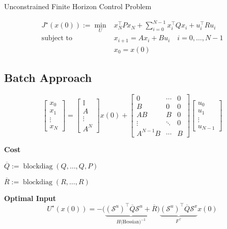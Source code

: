Unconstrained Finite Horizon Control Problem

$$\begin{aligned}
		J^\star(x(0)) :=
		\min_U & x_N^\top P x_N +
		\textstyle\sum_{i=0}^{N-1}
		x_i^\top Q x_i + u_i^\top R u_i
		\\
		\text{subject to  }
		       & x_{i+1}                = Ax_i+Bu_i
		\quad i  = 0,\dots,N-1                      \\
		       & x_0                    = x(0)
	\end{aligned}$$

\subsection{Batch Approach}

$$ \begin{bmatrix}
		x_0    \\
		x_1    \\
		\vdots \\
		x_N
	\end{bmatrix}
	=
	\begin{bmatrix}
		\mathbb{I} \\
		A          \\
		\vdots     \\
		A^N
	\end{bmatrix}
	x(0) +
	\begin{bmatrix}
		0        & \cdots & 0 \\
		B        & 0      & 0 \\
		AB       & B      & 0 \\
		\vdots   & \ddots & 0 \\
		A^{N-1}B & \cdots & B
	\end{bmatrix}
	\begin{bmatrix}
		u_0    \\
		u_1    \\
		\vdots \\
		u_{N-1}
	\end{bmatrix} $$

\textbf{Cost}

$\overline{Q} := \mathop{\mathrm{blockdiag}}(Q,\dots, Q,P)$

$\overline{R} := \mathop{\mathrm{blockdiag}}(R,\dots, R)$

\textbf{Optimal Input}
$$ U^\star(x(0)) =
	- \bigl(
	\underbrace{
			(\mathcal{S}^u)^\top \overline{Q} \mathcal{S}^u + \overline{R}
		}_{H\text{(Hessian)}^{-1}}
	\bigr)
	\underbrace{
		(\mathcal{S}^u)^\top \overline{Q}\mathcal{S}^x
	}_ {F^\top}
	x(0)
$$

